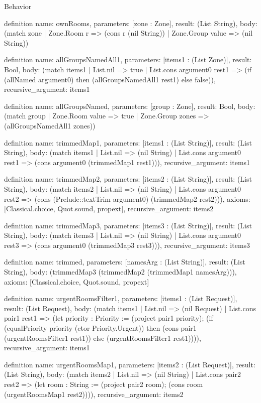 \begin{lexlean}{Behavior}
\begin{semanticmodule}
definition{
  name: ownRooms,
  parameters: [zone : Zone],
  result: (List String),
  body: (match zone | Zone.Room r => (cons r (nil String)) | Zone.Group value => (nil String))
}

definition{
  name: allGroupsNamedAll1,
  parameters: [items1 : (List Zone)],
  result: Bool,
  body: (match items1
    | List.nil => true
    | List.cons argument0 rest1 => (if (allNamed argument0) then (allGroupsNamedAll1 rest1) else false)),
  recursive_argument: items1
}

definition{
  name: allGroupsNamed,
  parameters: [group : Zone],
  result: Bool,
  body: (match group | Zone.Room value => true | Zone.Group zones => (allGroupsNamedAll1 zones))
}

definition{
  name: trimmedMap1,
  parameters: [items1 : (List String)],
  result: (List String),
  body: (match items1
    | List.nil => (nil String)
    | List.cons argument0 rest1 => (cons argument0 (trimmedMap1 rest1))),
  recursive_argument: items1
}

definition{
  name: trimmedMap2,
  parameters: [items2 : (List String)],
  result: (List String),
  body: (match items2
    | List.nil => (nil String)
    | List.cons argument0 rest2 => (cons (Prelude::textTrim argument0) (trimmedMap2 rest2))),
  axioms: [Classical.choice, Quot.sound, propext],
  recursive_argument: items2
}

definition{
  name: trimmedMap3,
  parameters: [items3 : (List String)],
  result: (List String),
  body: (match items3
    | List.nil => (nil String)
    | List.cons argument0 rest3 => (cons argument0 (trimmedMap3 rest3))),
  recursive_argument: items3
}

definition{
  name: trimmed,
  parameters: [namesArg : (List String)],
  result: (List String),
  body: (trimmedMap3 (trimmedMap2 (trimmedMap1 namesArg))),
  axioms: [Classical.choice, Quot.sound, propext]
}

definition{
  name: urgentRoomsFilter1,
  parameters: [items1 : (List Request)],
  result: (List Request),
  body: (match items1
    | List.nil => (nil Request)
    | List.cons pair1 rest1 => (let priority : Priority := (project pair1 priority); (if (equalPriority priority (ctor Priority.Urgent)) then (cons pair1 (urgentRoomsFilter1 rest1)) else (urgentRoomsFilter1 rest1)))),
  recursive_argument: items1
}

definition{
  name: urgentRoomsMap1,
  parameters: [items2 : (List Request)],
  result: (List String),
  body: (match items2
    | List.nil => (nil String)
    | List.cons pair2 rest2 => (let room : String := (project pair2 room); (cons room (urgentRoomsMap1 rest2)))),
  recursive_argument: items2
}


\end{semanticmodule}
\end{lexlean}
